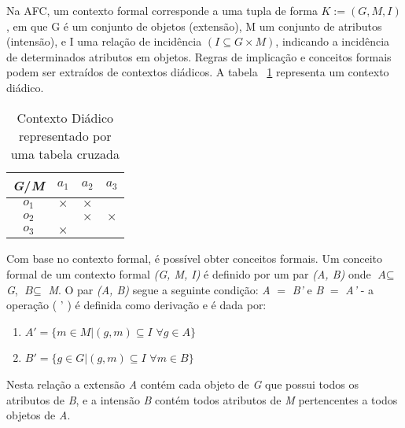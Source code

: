 \documentclass[kdmile,a4paper]{kdmile} %
\begin{document}
 Na AFC, um contexto formal corresponde a uma tupla de forma $K := (G, M, I)$, em que G é um conjunto de objetos (extensão), M um conjunto de atributos (intensão), e I uma relação de incidência $(I \subseteq G\times M)$, indicando a incidência de determinados atributos em objetos. Regras de implicação e conceitos formais podem ser extraídos de contextos diádicos. A tabela ~\ref{diadictable} representa um contexto diádico.

\begin{table}[h]
\centering
\caption{Contexto Diádico representado por uma tabela cruzada}
\label{diadictable}
\begin{tabular}{|c|c|l|l|c|l|l|c|l|l|}
\hline
\textit{\textbf{G}}/\textit{\textbf{M}} & \multicolumn{3}{c|}{\textbf{$a_{1}$}} & \multicolumn{3}{c|}{\textbf{$a_{2}$}} & \multicolumn{3}{c|}{\textbf{$a_{3}$}} \\ \hline
\textbf{\textit{$o_{1}$}}  & \multicolumn{3}{c|}{$\times$}  & \multicolumn{3}{c|}{$\times$}  & \multicolumn{3}{c|}{}   \\ \hline
\textbf{\textit{$o_{2}$}}  & \multicolumn{3}{c|}{}   & \multicolumn{3}{c|}{$\times$}  & \multicolumn{3}{c|}{$\times$}   \\ \hline
\textbf{\textit{$o_{3}$}}  & \multicolumn{3}{c|}{$\times$}  & \multicolumn{3}{c|}{}   & \multicolumn{3}{c|}{}   \\ \hline
\end{tabular}
\end{table}
 
 Com base no contexto formal, é possível obter conceitos formais. Um conceito formal de um contexto formal \textit{(G, M, I)} é definido por um par \textit{(A, B)} onde $ \textit{A} \subseteq $ \textit{G}, $ \textit{B} \subseteq $ \textit{M}.  O par \textit{(A, B)} segue a seguinte condição: \textit{A} $=$ \textit{B'} e \textit{B} $=$ \textit{A'} - a operação ( ' )  é definida como derivação e é dada por:
 
 \begin{enumerate}
     \item $A' = \{m \in M | (g, m) \subseteq I$ $ \forall g \in A\}$
     \item $B' = \{g \in G | (g, m) \subseteq I $ $\forall m \in B\}$
 \end{enumerate}

 Nesta relação a extensão \textit{A} contém cada objeto de \textit{G} que possui todos os atributos de \textit{B}, e a intensão \textit{B} contém todos atributos de \textit{M} pertencentes a todos objetos de \textit{A}.
\end{document}
